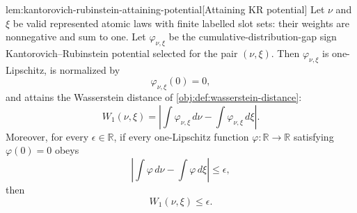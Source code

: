 \documentclass[11pt]{article}
\begin{document}
\begin{lemmav}{lem:kantorovich-rubinstein-attaining-potential}[Attaining KR potential]
Let \(\nu\) and \(\xi\) be valid represented atomic laws with finite labelled slot sets: their weights are nonnegative and sum to one.  Let \(\varphi_{\nu,\xi}\) be the cumulative-distribution-gap sign Kantorovich--Rubinstein potential selected for the pair \((\nu,\xi)\).  Then \(\varphi_{\nu,\xi}\) is one-Lipschitz, is normalized by
\[
\varphi_{\nu,\xi}(0)=0,
\]
and attains the Wasserstein distance of \cref{obj:def:wasserstein-distance}:
\[
W_1(\nu,\xi)
=
\left|
  \int \varphi_{\nu,\xi}\,d\nu
  -
  \int \varphi_{\nu,\xi}\,d\xi
\right|.
\]
Moreover, for every \(\epsilon\in\mathbb R\), if every one-Lipschitz function \(\varphi:\mathbb R\to\mathbb R\) satisfying \(\varphi(0)=0\) obeys
\[
\left|
  \int \varphi\,d\nu
  -
  \int \varphi\,d\xi
\right|
\le \epsilon,
\]
then
\[
W_1(\nu,\xi)\le \epsilon.
\]
\end{lemmav}
\end{document}
